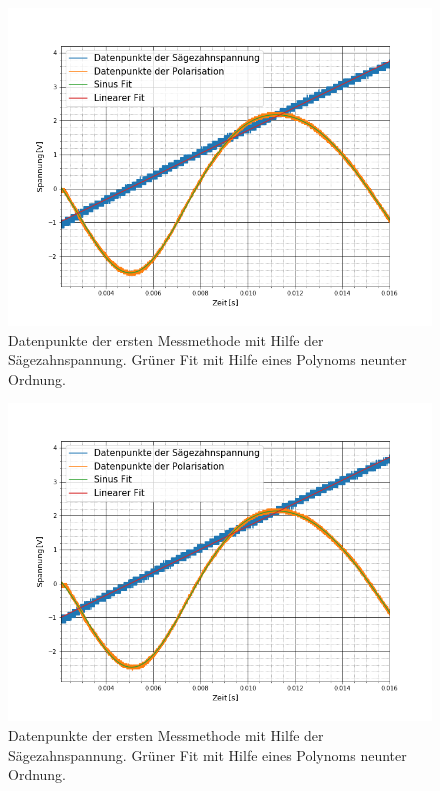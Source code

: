 \begin{figure}[ht]
	\includegraphics[scale=0.5]{Bild/V1_5}
	\centering
	\caption[Plot zu Versuchsteil 1 Nr.5]{Datenpunkte der ersten Messmethode mit Hilfe der Sägezahnspannung. Grüner Fit mit Hilfe eines Polynoms neunter Ordnung.}
\end{figure}
\begin{figure}[ht]
	\includegraphics[scale=0.5]{Bild/V1_6}
	\centering
	\caption[Plot zu Versuchsteil 1 Nr.6]{Datenpunkte der ersten Messmethode mit Hilfe der Sägezahnspannung. Grüner Fit mit Hilfe eines Polynoms neunter Ordnung.}
\end{figure}
